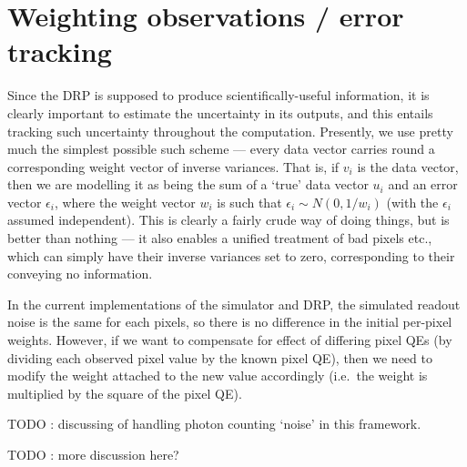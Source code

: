 \section{Weighting observations / error tracking}
\label{sec:weighting}

Since the DRP is supposed to produce scientifically-useful information,
it is clearly important to estimate the uncertainty in its outputs,
and this entails tracking such uncertainty throughout the computation.
Presently, we use pretty much the simplest possible such scheme ---
every data vector carries round a corresponding weight vector of inverse
variances. That is, if $v_i$ is the data vector, then we are modelling
it as being the sum of a `true' data vector $u_i$ and an error vector
$\epsilon_i$, where the weight vector $w_i$ is such that $\epsilon_i
\sim N(0, 1/w_i)$ (with the $\epsilon_i$ assumed independent).
This is clearly a fairly crude way of doing things, but is better
than nothing --- it also enables a unified treatment of bad pixels etc.,
which can simply have their inverse variances set to zero, corresponding
to their conveying no information.

In the current implementations of the simulator and DRP, the simulated
readout noise is the same for each pixels, so there is no difference in
the initial per-pixel weights. However, if we want to compensate for
effect of differing pixel QEs (by dividing each observed pixel value by
the known pixel QE), then we need to modify the weight attached to the
new value accordingly (i.e.\ the weight is multiplied by the square of
the pixel QE).

TODO : discussing of handling photon counting `noise' in this framework.

TODO : more discussion here?
